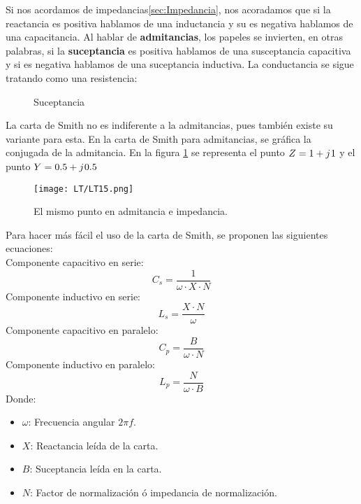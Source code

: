 \documentclass[
	12pt, %
	fleqn, %
	a4paper, %
	oneside, %
]{LegrandOrangeBook}
\begin{document}
Si nos acordamos de  impedancias\ref{sec:Impedancia}, nos acoradamos que si la reactancia es positiva hablamos de una inductancia y su es negativa hablamos de una capacitancia. Al hablar de \textbf{admitancias}, los papeles se invierten, en otras palabras, si la \textbf{suceptancia} es positiva hablamos de una susceptancia capacitiva y si es negativa hablamos de una suceptancia inductiva. La conductancia se sigue tratando como una resistencia:
\begin{figure}[H]
\centering
{}
\caption{Suceptancia}
\end{figure}
La carta de Smith no es indiferente a la admitancias, pues también existe su variante para esta. En la carta de Smith para admitancias, se gráfica la conjugada de la admitancia. En la figura \ref{fig:admivsimp} se representa el punto $Z=1+{j\mkern1mu} 1$ y el punto $Y=0.5+{j\mkern1mu} 0.5$
\begin{figure}[H]
\centering
\texttt{[image: LT/LT15.png]}
\caption{El mismo punto en admitancia e impedancia.}
\label{fig:admivsimp}
\end{figure}
\begin{corollary}\label{cor:rlc}
Para hacer más fácil el uso de la carta de Smith, se proponen las siguientes ecuaciones:\\
Componente capacitivo en serie:
\begin{equation}
C_s=\frac{1}{\omega\cdot X\cdot N}
\label{eq:cap ser}
\end{equation}
Componente inductivo en serie:
\begin{equation}
L_s=\frac{X\cdot N}{\omega}
\label{eq:ind serie}
\end{equation}
Componente capacitivo en paralelo:
\begin{equation}
C_p=\frac{B}{\omega\cdot N}
\label{eq:cap par}
\end{equation}
Componente inductivo en paralelo:
\begin{equation}
L_p=\frac{N}{\omega\cdot B}
\label{eq:ind par}
\end{equation}
Donde:
\begin{itemize}
\item $\omega$: Frecuencia angular $2\pi f$.
\item $X$: Reactancia leída de la carta.
\item $B$: Suceptancia leída en la carta.
\item $N$: Factor de normalización ó impedancia de normalización.
\end{itemize}
\end{corollary}
\end{document}
